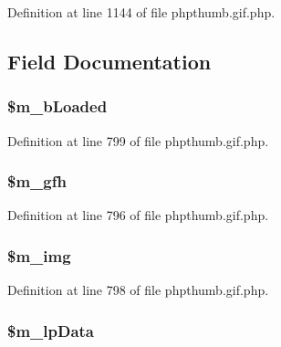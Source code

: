 \-Definition at line 1144 of file phpthumb.\-gif.\-php.




\subsection{\-Field \-Documentation}
\hypertarget{class_c_g_i_f_a6b4d0a2f0b091a97721f9fb4d14a4005}{
\subsubsection[{\$m\-\_\-b\-Loaded}]{\setlength{\rightskip}{0pt plus 5cm}\$m\-\_\-b\-Loaded}}\label{class_c_g_i_f_a6b4d0a2f0b091a97721f9fb4d14a4005}


\-Definition at line 799 of file phpthumb.\-gif.\-php.

\hypertarget{class_c_g_i_f_a3ec9769e9e8427e34ba0e799acb3382c}{
\subsubsection[{\$m\-\_\-gfh}]{\setlength{\rightskip}{0pt plus 5cm}\$m\-\_\-gfh}}\label{class_c_g_i_f_a3ec9769e9e8427e34ba0e799acb3382c}


\-Definition at line 796 of file phpthumb.\-gif.\-php.

\hypertarget{class_c_g_i_f_a3128bc33c0f5fbf0944deba2e25aeade}{
\subsubsection[{\$m\-\_\-img}]{\setlength{\rightskip}{0pt plus 5cm}\$m\-\_\-img}}\label{class_c_g_i_f_a3128bc33c0f5fbf0944deba2e25aeade}


\-Definition at line 798 of file phpthumb.\-gif.\-php.

\hypertarget{class_c_g_i_f_a6ff7a0a783503784071f70f8c094a261}{
\subsubsection[{\$m\-\_\-lp\-Data}]{\setlength{\rightskip}{0pt plus 5cm}\$m\-\_\-lp\-Data}}\label{class_c_g_i_f_a6ff7a0a783503784071f70f8c094a261}


